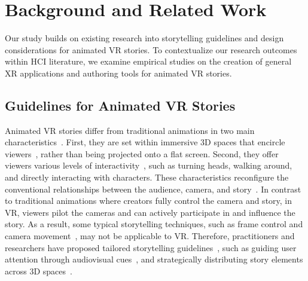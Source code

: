 \section{Background and Related Work}

Our study builds on existing research into storytelling guidelines and design considerations for animated VR stories. To contextualize our research outcomes within HCI literature, we examine empirical studies on the creation of general XR applications and authoring tools for animated VR stories.

\subsection{Guidelines for Animated VR Stories}
Animated VR stories differ from traditional animations in two main characteristics~\cite{cutler2019making, godde2018cinematic}. First, they are set within immersive 3D spaces that encircle viewers~\cite{godde2018cinematic, serrano2017movie}, rather than being projected onto a flat screen. Second, they offer viewers various levels of interactivity~\cite{tong2021viewer, rothe2019interactioninCVR}, such as turning heads, walking around, and directly interacting with characters. 
These characteristics reconfigure the conventional relationships between the audience, camera, and story~\cite{henrikson2016multi, tong2022adaptive}. 
In contrast to traditional animations where creators fully control the camera and story, in VR, viewers pilot the cameras and can actively participate in and influence the story. 
As a result, some typical storytelling techniques, such as frame control and camera movement~\cite{serrano2017movie,henrikson2016multi}, may not be applicable to VR. 
Therefore, practitioners and researchers have proposed tailored storytelling guidelines~\cite{cutler2019making, williams2021virtual, aitamurto2021fomo, gupta2020roleplaying}, such as guiding user attention through audiovisual cues~\cite{rothe2019guidance, schmitz2020directing}, and strategically distributing story elements across 3D spaces~\cite{kvisgaard2019frames, pope2017geometry}.

